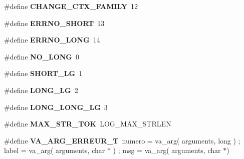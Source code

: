\begin{DoxyCompactItemize}
\#define {\bf CHANGE\_\-CTX\_\-FAMILY}~12
\item 
\#define {\bf ERRNO\_\-SHORT}~13
\item 
\#define {\bf ERRNO\_\-LONG}~14
\item 
\#define {\bf NO\_\-LONG}~0
\item 
\#define {\bf SHORT\_\-LG}~1
\item 
\#define {\bf LONG\_\-LG}~2
\item 
\#define {\bf LONG\_\-LONG\_\-LG}~3
\item 
\#define {\bf MAX\_\-STR\_\-TOK}~LOG\_\-MAX\_\-STRLEN
\item 
\#define {\bf VA\_\-ARG\_\-ERREUR\_\-T}~numero = va\_\-arg( arguments, long ) ; label  = va\_\-arg( arguments, char $\ast$ ) ; msg    = va\_\-arg( arguments, char $\ast$)
\end{DoxyCompactItemize}
